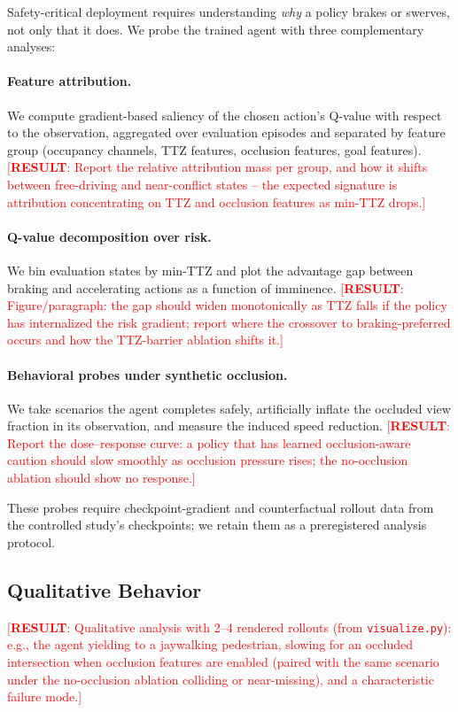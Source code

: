 \documentclass{article}
\newcommand{\results}[1]{\textcolor{red}{[\textbf{RESULT}: #1]}}
\begin{document}
Safety-critical deployment requires understanding \emph{why} a policy
brakes or swerves, not only that it does. We probe the trained agent with
three complementary analyses:

\paragraph{Feature attribution.} We compute gradient-based saliency of the
chosen action's Q-value with respect to the observation, aggregated over
evaluation episodes and separated by feature group (occupancy channels, TTZ
features, occlusion features, goal features). \results{Report the relative
attribution mass per group, and how it shifts between free-driving and
near-conflict states -- the expected signature is attribution concentrating
on TTZ and occlusion features as min-TTZ drops.}

\paragraph{Q-value decomposition over risk.} We bin evaluation states by
min-TTZ and plot the advantage gap between braking and accelerating actions
as a function of imminence. \results{Figure/paragraph: the gap should widen
monotonically as TTZ falls if the policy has internalized the risk
gradient; report where the crossover to braking-preferred occurs and how
the TTZ-barrier ablation shifts it.}

\paragraph{Behavioral probes under synthetic occlusion.} We take scenarios
the agent completes safely, artificially inflate the occluded view fraction
in its observation, and measure the induced speed reduction.
\results{Report the dose--response curve: a policy that has learned
occlusion-aware caution should slow smoothly as occlusion pressure rises;
the no-occlusion ablation should show no response.}

These probes require checkpoint-gradient and counterfactual rollout data
from the controlled study's checkpoints; we retain them as a preregistered
analysis protocol.

\subsection{Qualitative Behavior}

\results{Qualitative analysis with 2--4 rendered rollouts (from
\texttt{visualize.py}): e.g., the agent yielding to a jaywalking pedestrian,
slowing for an occluded intersection when occlusion features are enabled
(paired with the same scenario under the no-occlusion ablation colliding or
near-missing), and a characteristic failure mode.}
\end{document}

